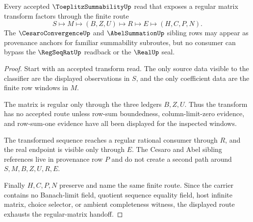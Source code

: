 \begin{theorem}\label{thm:toeplitz-summability-regular-matrix-handoff}
Every accepted $\ToeplitzSummabilityUp$ read that exposes a regular matrix transform factors through the finite route
$$
S \longmapsto M \longmapsto (B,Z,U) \longmapsto R \longmapsto E \longmapsto (H,C,P,N).
$$
The $\CesaroConvergenceUp$ and $\AbelSummationUp$ sibling rows may appear as provenance anchors for familiar summability subroutes, but no consumer can bypass the $\RegSeqRatUp$ readback or the $\RealUp$ seal.
\end{theorem}
\begin{proof}
Start with an accepted transform read. The only source data visible to the classifier are the displayed observations in $S$, and the only coefficient data are the finite row windows in $M$.

The matrix is regular only through the three ledgers $B,Z,U$. Thus the transform has no accepted route unless row-sum boundedness, column-limit-zero evidence, and row-sum-one evidence have all been displayed for the inspected windows.

The transformed sequence reaches a regular rational consumer through $R$, and the real endpoint is visible only through $E$. The Cesaro and Abel sibling references live in provenance row $P$ and do not create a second path around $S,M,B,Z,U,R,E$.

Finally $H,C,P,N$ preserve and name the same finite route. Since the carrier contains no Banach-limit field, quotient sequence equality field, host infinite matrix, choice selector, or ambient completeness witness, the displayed route exhausts the regular-matrix handoff.
\end{proof}

